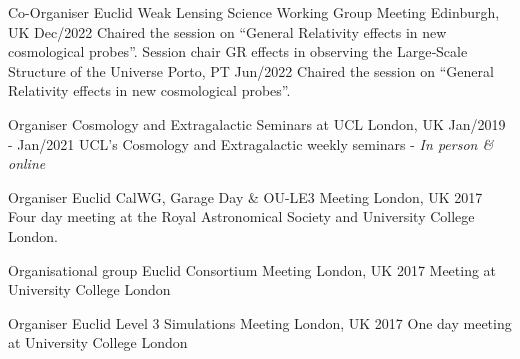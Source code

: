 

\begin{cventries}
  \cventry
    {Co-Organiser} %
    {Euclid Weak Lensing Science Working Group Meeting} %
    {Edinburgh, UK} %
    {Dec/2022} %
    {
{Chaired the session on ``General Relativity effects in new cosmological probes''.}
    }
  \cventry
    {Session chair} %
    {GR effects in observing the Large‑Scale Structure of the Universe} %
    {Porto, PT} %
    {Jun/2022} %
    {
{Chaired the session on ``General Relativity effects in new cosmological probes''.}
    }
    
  \cventry
    {Organiser} %
    {Cosmology and Extragalactic Seminars at UCL} %
    {London, UK} %
    {Jan/2019 - Jan/2021} %
    {
{UCL's Cosmology and Extragalactic weekly seminars - \textit{In person \& online}}
    }
    
 \cventry
    {Organiser} %
    {Euclid CalWG, Garage Day \& OU-LE3 Meeting} %
    {London, UK} %
    {2017} %
    {
{Four day meeting at the Royal Astronomical Society and
University College London.}
    }

  \cventry
    {Organisational group} %
    {Euclid Consortium Meeting} %
    {London, UK} %
    {2017} %
    {
        {Meeting at University College London}
    }
    
  \cventry
    {Organiser} %
    {Euclid Level 3 Simulations Meeting} %
    {London, UK} %
    {2017} %
    {
 {One day meeting at University College London}
    }


\end{cventries}
